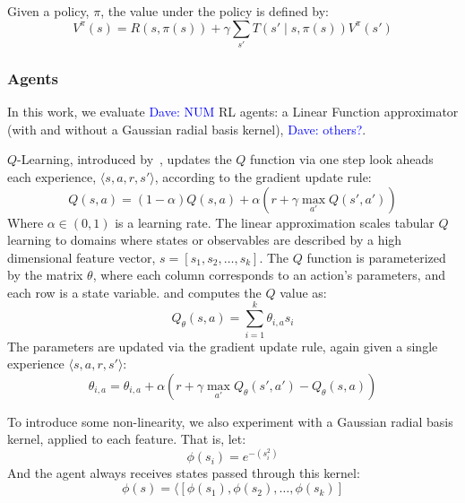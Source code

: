 \documentclass{article}
\newcommand{\dnote}[1]{\textcolor{blue}{Dave: #1}}
\begin{document}
Given a policy, $\pi$, the value under the policy is defined by:
\begin{equation}
V^\pi(s) = R(s, \pi(s)) + \gamma \sum_{s'} T(s' \mid s, \pi(s)) V^\pi(s')
\end{equation}

\subsubsection{Agents}
In this work, we evaluate \dnote{NUM} RL agents: a Linear Function approximator (with and without a Gaussian radial basis kernel), \dnote{others?}.

$Q$-Learning, introduced by~\citet{watkins1992q}, updates the $Q$ function via one step look aheads each experience, $\langle s, a, r, s' \rangle$, according to the gradient update rule:
\begin{equation}
Q(s,a) = (1-\alpha) Q(s,a) + \alpha(r + \gamma \max_{a'} Q(s', a'))
\end{equation}
Where $\alpha \in (0,1)$ is a learning rate. The linear approximation scales tabular $Q$ learning to domains where states or observables are described by a high dimensional feature vector, $s = [s_1, s_2, \ldots, s_k]$. The $Q$ function is parameterized by the matrix $\theta$, where each column corresponds to an action's parameters, and each row is a state variable. and computes the $Q$ value as:
\begin{equation}
Q_\theta(s,a) = \sum_{i=1}^k \theta_{i,a} s_i
\end{equation}
The parameters are updated via the gradient update rule, again given a single experience $\langle s, a, r, s' \rangle$:
\begin{equation}
\theta_{i,a} = \theta_{i,a} + \alpha \left( r + \gamma \max_{a'} Q_\theta(s',a') - Q_\theta(s,a)\right)
\end{equation}

To introduce some non-linearity, we also experiment with a Gaussian radial basis kernel, applied to each feature. That is, let:
\begin{equation}
\phi(s_i) = e^{-(s_i^2)}
\end{equation}
And the agent always receives states passed through this kernel:
\begin{equation}
\phi(s) = \langle [\phi(s_1), \phi(s_2), \ldots, \phi(s_k)]
\end{equation}


\end{document}

